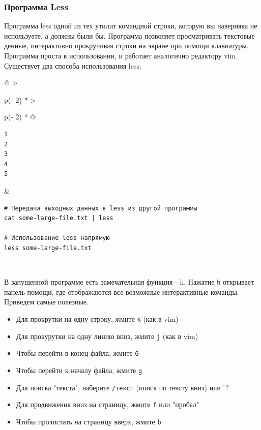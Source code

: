 \documentclass{report}
\begin{document}
\hypertarget{Less}{%
\subsubsection{\texorpdfstring{\protect\hyperlink{Less}{}Программа
Less}{Программа Less}}\label{Less}}

Программа less одной из тех утилит командной строки, которую вы
наверняка не используете, а должны были бы. Программа позволяет
просматривать текстовые денные, интерактивно прокручивая строки на
экране при помощи клавиатуры. Программа проста в использовании, и
работает аналогично редактору vim. Существует два способа использования
less:

\begin{longtable}[]{@{}
  >{\raggedright\arraybackslash}p{(\columnwidth - 2\tabcolsep) * }
  >{\raggedright\arraybackslash}p{(\columnwidth - 2\tabcolsep) * }@{}}
\toprule
\endhead
\begin{minipage}[t]{\linewidth}\raggedright
\begin{verbatim}
1
2
3
4
5
\end{verbatim}
\end{minipage} & \begin{minipage}[t]{\linewidth}\raggedright
\begin{verbatim}
# Передача выходных данных в less из другой программы
cat some-large-file.txt | less

# Использование less напрямую
less some-large-file.txt
\end{verbatim}
\end{minipage} \\ \addlinespace
\bottomrule
\end{longtable}

В запущенной программе есть замечательная функция - h. Нажатие
\texttt{h} открывает панель помощи, где отображаются все возможные
интерактивные команды. Приведем самые полезные.

\begin{itemize}
\tightlist
\item
  Для прокрутки на одну строку, жмите \texttt{k} (как в vim)
\item
  Для прокурутки на одну линию вниз, жмите \texttt{j} (как в vim)
\item
  Чтобы перейти в конец файла, жмите \texttt{G}
\item
  Чтобы перейти к началу файла, жмите \texttt{g}
\item
  Для поиска "текста", наберите \texttt{/текст} (поиск по тексту вниз)
  или '?
\item
  Для продвижения вниз на страницу, жмите \texttt{f} или "пробел"
\item
  Чтобы пролистать на страницу вверх, жмите \texttt{b}
\end{itemize}
\end{document}
